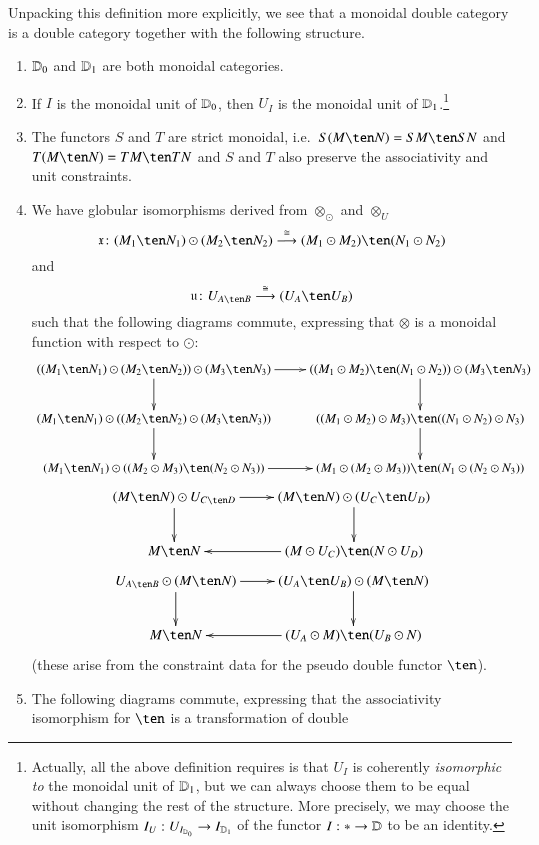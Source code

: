 \documentclass{amsart}
\begin{document}
Unpacking this definition more explicitly, we see that a monoidal
double category is a double category together with the following
structure.
\begin{enumerate}
\item $\mathbb{D}_0$ and $\mathbb{D}_1$ are both monoidal categories.
\item If $I$ is the monoidal unit of $\mathbb{D}_0$, then $U_I$ is the
  monoidal unit of $\mathbb{D}_1$.\footnote{Actually, all the above
    definition requires is that $U_I$ is coherently \emph{isomorphic
      to} the monoidal unit of $\mathbb{D}_1$, but we can always choose them
    to be equal without changing the rest of the structure.
    More precisely, we may choose the unit isomorphism
    $I_U : U_{I_{\mathbb{D}_0}} \to I_{\mathbb{D}_1}$ of the functor $I:* \to \mathbb{D}$
    to be an identity.}
\item The functors $S$ and $T$ are strict monoidal, i.e.\ $S(M\ten N)
  = SM\ten SN$ and $T(M\ten N)=TM\ten TN$ and $S$ and $T$ also
  preserve the associativity and unit constraints.
\item \label{eq:mon1} We have globular isomorphisms derived from $\otimes_{\odot}$ and $\otimes_U$
  \[\fx\maps (M_1\ten N_1)\odot (M_2\ten N_2)\too[\iso] (M_1\odot M_2)\ten (N_1\odot N_2)\]
  and
  \[\fu\maps U_{A\ten B} \too[\iso] (U_A \ten U_B)\]
  such that the following diagrams commute, expressing that $\otimes$ is a monoidal function with respect to $\odot$:
\[
  \xymatrix{
    ((M_1\ten N_1)\odot (M_2\ten N_2)) \odot (M_3\ten N_3) \ar[r]\ar[d]
    & ((M_1\odot M_2)\ten (N_1\odot N_2)) \odot (M_3\ten N_3) \ar[d]\\
    (M_1\ten N_1)\odot ((M_2\ten N_2) \odot (M_3\ten N_3)) \ar[d] &
    ((M_1\odot M_2)\odot M_3) \ten ((N_1\odot N_2)\odot N_3) \ar[d]\\
    (M_1\ten N_1) \odot ((M_2\odot M_3) \ten (N_2\odot N_3))\ar[r] &
    (M_1\odot (M_2\odot M_3)) \ten (N_1\odot (N_2\odot N_3))}\]
  \[\xymatrix{(M\ten N) \odot U_{C\ten D} \ar[r]\ar[d] &
    (M\ten N)\odot (U_C\ten U_D) \ar[d]\\
    M\ten N\ar@{<-}[r] & (M\odot U_C) \ten (N\odot U_D)}\]
  \[\xymatrix{U_{A\ten B}\odot (M\ten N)  \ar[r]\ar[d] &
    (U_A\ten U_B)\odot (M\ten N) \ar[d]\\
    M\ten N\ar@{<-}[r] & (U_A \odot M) \ten (U_B\odot N)}\]
  (these arise from the constraint data for the pseudo double functor
  $\ten$).
\item \label{eq:mon2}The following diagrams commute, expressing that the
  associativity isomorphism for $\ten$ is a transformation of double

\end{enumerate}
\end{document}
